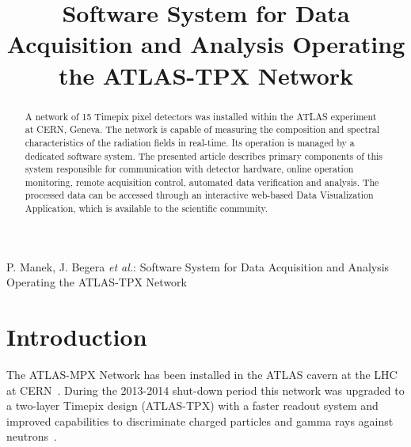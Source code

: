 \documentclass[conference]{IEEEtran}
\begin{document}
\title{Software System for Data Acquisition and Analysis Operating the ATLAS-TPX Network}

\author{
}

\markboth{}%
{P. Manek, J. Begera \MakeLowercase{\textit{et al.}}: Software System for Data Acquisition and Analysis Operating the ATLAS-TPX Network}

\maketitle


\begin{abstract}
A network of 15 Timepix pixel detectors was installed within the ATLAS experiment at CERN, Geneva. The network is capable of measuring the composition and spectral characteristics of the radiation fields in real-time. Its operation is managed by a dedicated software system. The presented article describes primary components of this system responsible for communication with detector hardware, online operation monitoring, remote acquisition control, automated data verification and analysis. The processed data can be accessed through an interactive web-based Data Visualization Application, which is available to the scientific community.
\end{abstract}

\section{\label{sec:introduction}Introduction}
The ATLAS-MPX Network has been installed in the ATLAS cavern at the LHC at CERN~\cite{CampbellATLAS}. During the 2013-2014 shut-down period this network was upgraded to a two-layer Timepix design (ATLAS-TPX) with a faster readout system and improved capabilities to discriminate charged particles and gamma rays against neutrons~\cite{Proposal_Claude,Bergmann_ATLASTPX_2016}.
\end{document}
